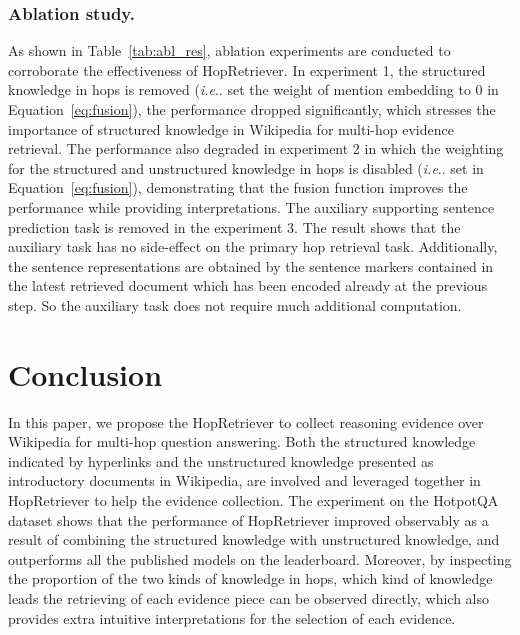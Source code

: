 \documentclass[letterpaper]{article} \usepackage{aaai21}  \usepackage{times}  \usepackage{helvet} \usepackage{courier}  \usepackage[hyphens]{url}  \usepackage{graphicx} \urlstyle{rm} \def\UrlFont{\rm}  \usepackage{graphicx}  \usepackage{natbib}  \usepackage{caption} \frenchspacing  \setlength{\pdfpagewidth}{8.5in}  \setlength{\pdfpageheight}{11in}
\makeatletter
\DeclareRobustCommand\onedot{\futurelet\@let@token\@onedot}
\def\@onedot{\ifx\@let@token.\else.\null\fi\xspace}
\def\ie{\emph{i.e}\onedot} \def\Ie{\emph{I.e}\onedot}
\makeatother
\begin{document}
\subsubsection{Ablation study.}
As shown in Table~\ref{tab:abl_res}, ablation experiments are conducted to corroborate the effectiveness of HopRetriever. In experiment 1, the structured knowledge in hops is removed (\ie set the weight of mention embedding  to 0 in Equation~\ref{eq:fusion}), the performance dropped significantly, which stresses the importance of structured knowledge in Wikipedia for multi-hop evidence retrieval. The performance also degraded in experiment 2 in which the weighting for the structured and unstructured knowledge in hops is disabled  (\ie set  in Equation~\ref{eq:fusion}), demonstrating that the fusion function improves the performance while providing interpretations. The auxiliary supporting sentence prediction task is removed in the experiment 3. The result shows that the auxiliary task has no side-effect on the primary hop retrieval task. Additionally, the sentence representations are obtained by the sentence markers contained in the latest retrieved document which has been encoded already at the previous step. So the auxiliary task does not require much additional computation.


\section{Conclusion}
In this paper, we propose the HopRetriever to collect reasoning evidence over Wikipedia for multi-hop question answering. Both the structured knowledge indicated by hyperlinks and the unstructured knowledge presented as introductory documents in Wikipedia, are involved and leveraged together in HopRetriever to help the evidence collection. The experiment on the HotpotQA dataset shows that the performance of HopRetriever improved observably as a result of combining the structured knowledge with unstructured knowledge, and outperforms all the published models on the leaderboard. Moreover, by inspecting the proportion of the two kinds of knowledge in hops, which kind of knowledge leads the retrieving of each evidence piece can be observed directly, which also provides extra intuitive interpretations for the selection of each evidence. 

\end{document}
